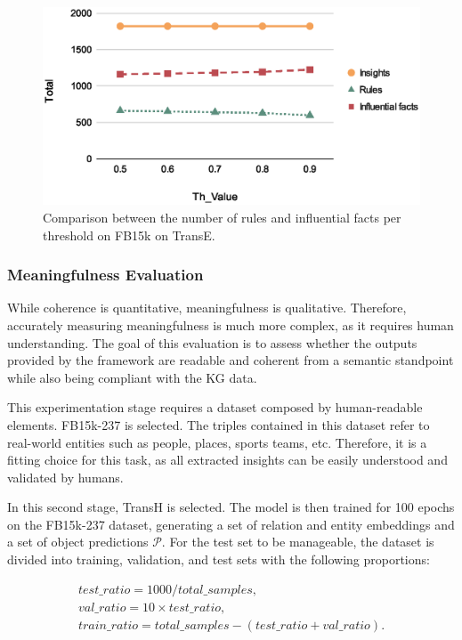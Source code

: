 \begin{figure}[t]
    \centering
    \includegraphics[width=.9\linewidth]{6_kbsextractiondl/figures/coherence_geni_th.eps}
    \caption{Comparison between the number of rules and influential facts per threshold on FB15k on TransE.}
    \label{fig:coherence_geni_th}
\end{figure}

\subsubsection{Meaningfulness Evaluation}
While coherence is quantitative, meaningfulness is qualitative. Therefore, accurately measuring meaningfulness is much more complex, as it requires human understanding. The goal of this evaluation is to assess whether the outputs provided by the framework are readable and coherent from a semantic standpoint while also being compliant with the KG data.

This experimentation stage requires a dataset composed by human-readable elements. FB15k-237 is selected. The triples contained in this dataset refer to real-world entities such as people, places, sports teams, etc. Therefore, it is a fitting choice for this task, as all extracted insights can be easily understood and validated by humans.

In this second stage, TransH is selected. The model is then trained for 100 epochs on the FB15k-237 dataset, generating a set of relation and entity embeddings and a set of object predictions $\mathcal{P}$. For the test set to be manageable, the dataset is divided into training, validation, and test sets with the following proportions:

  \begin{minipage}{\linewidth}
  \begin{align}
   test\_ratio=1000/total\_samples, \nonumber  \\
   val\_ratio=10 \times test\_ratio, \nonumber \\
   train\_ratio=total\_samples-(test\_ratio+val\_ratio).
\end{align}
\label{eq:split_ratio}
  \end{minipage}

